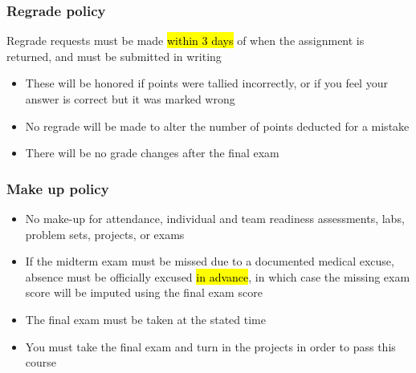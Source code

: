 \documentclass[11pt,containsverbatim,handout,xcolor=xelatex,dvipsnames,table]{beamer}
\begin{document}

\begin{frame}
\frametitle{Regrade policy}

Regrade requests must be made \hl{within 3 days} of when the assignment is returned, and must be submitted in writing 

\begin{itemize}

\item These will be honored if points were tallied incorrectly, or if you feel your answer is correct but it was marked wrong

\item No regrade will be made to alter the number of points deducted for a mistake

\item There will be no grade changes after the final exam

\end{itemize}

\end{frame}


\begin{frame}
\frametitle{Make up policy}

\begin{itemize}

\item No make-up for attendance, individual and team readiness assessments, labs, problem sets, projects, or exams

\item If the midterm exam must be missed due to a documented medical excuse, absence must be officially excused \hl{in advance}, in which case the missing exam score will be imputed using the final exam score

\item The final exam must be taken at the stated time

\item You must take the final exam and turn in the projects in order to pass this course

\end{itemize}

\end{frame}

\end{document}
